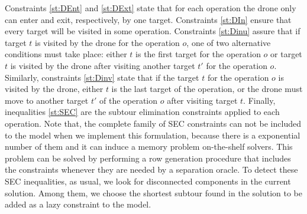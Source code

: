 \documentclass{itor}
\theoremstyle{definition}
\theoremstyle{remark}
\begin{document}
Constraints \eqref{st:DEnt} and \eqref{st:DExt} state that for each operation the drone only can enter and exit, respectively, by one target.  Constraints \eqref{st:DIn} ensure that every target will be visited in some operation. Constraints \eqref{st:Dinu} assure that if target $t$ is visited by the drone for the operation $o$, one of two alternative conditions must take place: either $t$ is the first target for the operation $o$ or target $t$ is visited by the drone after visiting another target $t'$ for the operation $o$. Similarly, constraints \eqref{st:Dinv} state that if the target $t$ for the operation $o$ is visited by the drone, either $t$ is the last target of the operation, or the drone must move to another target $t'$ of the operation $o$ after visiting target $t$. Finally, inequalities \eqref{st:SEC} are the subtour elimination constraints applied to each operation. Note that, the complete family of SEC constraints can not be included to the model when we implement this formulation, because there is a exponential number of them and it can induce a memory problem on-the-shelf solvers. This problem can be solved by performing a row generation procedure that includes the constraints whenever they are needed by a separation oracle. To detect these SEC inequalities, as usual, we look for disconnected components in the current solution. Among them, we choose the shortest subtour found in the solution to be added as a lazy constraint to the model.\\


\end{document}
